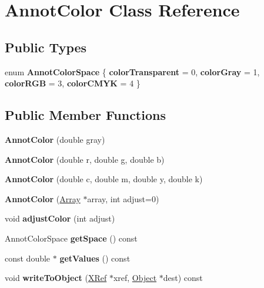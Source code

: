 \hypertarget{class_annot_color}{}\section{Annot\+Color Class Reference}
\label{class_annot_color}
\subsection*{Public Types}
\begin{DoxyCompactItemize}
\item 
\mbox{\label{class_annot_color_a66e1573126e3fdabc1f168ed87d1e74d}} 
enum {\bfseries Annot\+Color\+Space} \{ {\bfseries color\+Transparent} = 0, 
{\bfseries color\+Gray} = 1, 
{\bfseries color\+R\+GB} = 3, 
{\bfseries color\+C\+M\+YK} = 4
 \}
\end{DoxyCompactItemize}
\subsection*{Public Member Functions}
\begin{DoxyCompactItemize}
\item 
\mbox{\label{class_annot_color_aa7b679ba7b61e3f40af6f3a40155f33b}} 
{\bfseries Annot\+Color} (double gray)
\item 
\mbox{\label{class_annot_color_ab720c2ab4e52426ecd3b4b5542cea948}} 
{\bfseries Annot\+Color} (double r, double g, double b)
\item 
\mbox{\label{class_annot_color_a59a7f23c7be9eb2047e92db02fae1e6c}} 
{\bfseries Annot\+Color} (double c, double m, double y, double k)
\item 
\mbox{\label{class_annot_color_abbe0740576bdfad40bc4b7b7826d8b33}} 
{\bfseries Annot\+Color} (\hyperlink{class_array}{Array} $\ast$array, int adjust=0)
\item 
\mbox{\label{class_annot_color_a9c09d69fd5fafce397566cd4ac8e75a1}} 
void {\bfseries adjust\+Color} (int adjust)
\item 
\mbox{\label{class_annot_color_a05066735b2387c1bf5ee3be1ea1b84f9}} 
Annot\+Color\+Space {\bfseries get\+Space} () const
\item 
\mbox{\label{class_annot_color_a881a211fed5161fc7d514857d1297741}} 
const double $\ast$ {\bfseries get\+Values} () const
\item 
\mbox{\label{class_annot_color_a664855155ab6a3a0950abcfff1c980d4}} 
void {\bfseries write\+To\+Object} (\hyperlink{class_x_ref}{X\+Ref} $\ast$xref, \hyperlink{class_object}{Object} $\ast$dest) const
\end{DoxyCompactItemize}


